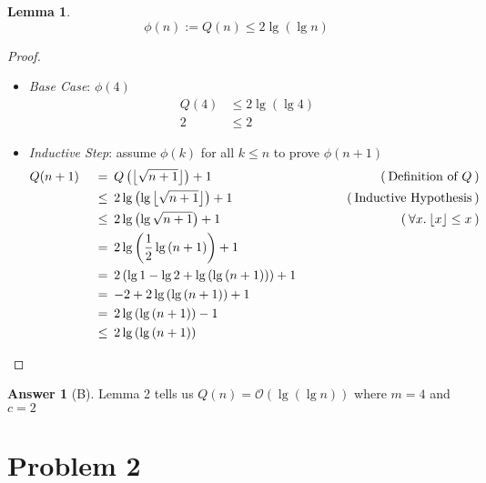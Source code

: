 \documentclass{article}
\newtheorem{lemma}{Lemma}
\theoremstyle{definition}
\newtheorem*{answer}{Answer}
\DeclarePairedDelimiter\floor{\lfloor}{\rfloor}
\newcommand{\evidence}[1]{\ensuremath{\hspace{3em} (\hspace{0.2em} \text{#1} \hspace{0.2em})}}
\newcommand{\asymptotic}[3]{\ensuremath{#2 = #1(#3)}}
\newcommand{\bigO}[2]{\asymptotic{\mathcal{O}}{#1}{#2}}
\newcommand{\relation}[1]{\ensuremath{\hspace{0.2em} {{} #1 {}} \hspace{0.2em}}}
\newcommand{\equal}{\relation{=}}
\newcommand{\lesseq}{\relation{\le}}
\newcommand{\parens}[1]{\left(#1\right)}
\newcommand{\lglg}[1]{\ensuremath{\lg{\parens{\lg{#1}}}}}
\begin{document}
\begin{lemma}
  \begin{equation*}
    \phi(n) := Q(n) \le 2\lglg{n}
  \end{equation*}
\end{lemma}
\begin{proof}
  \hfill
  \begin{itemize}
  \item
    \textit{Base Case}: $\phi(4)$
    \begin{align*}
      Q(4) &\le 2\lglg{4} \\
      2 &\le 2
    \end{align*}
  \item
    \textit{Inductive Step}: assume $\phi(k)$ for all $k \le n$ to prove $\phi(n + 1)$
    \begin{alignat*}{4}
      & Q(n + 1) & \equal & Q\left(\floor*{\sqrt{n + 1}}\right) + 1 & \evidence{Definition of $Q$} \\
      & {}       & \lesseq & 2\lglg{\floor*{\sqrt{n + 1}}} + 1       & \evidence{Inductive Hypothesis} \\
      & {}       & \lesseq & 2\lglg{\sqrt{n + 1}} + 1                & \evidence{$\forall x. \hspace{0.2em} \floor*{x} \le x$} \\
      & {}       & \equal  & 2\lg{\parens{\frac{1}{2}\lg{\parens{n + 1}}}} + 1     & {} \\
      & {}       & \equal  & 2\parens{\lg{1} - \lg{2} + \lglg{\parens{n + 1}}} + 1 & {} \\
      & {}       & \equal  & {-2} + 2\lglg{\parens{n + 1}} + 1                     & {} \\
      & {}       & \equal  & 2\lglg{\parens{n + 1}} - 1                            & {} \\
      & {}       & \lesseq & 2\lglg{\parens{n + 1}}                                & \qedhere
    \end{alignat*}
  \end{itemize}
\end{proof}
\begin{answer}[B]
  Lemma 2 tells us $\bigO{Q(n)}{\lglg{n}}$ where $m = 4$ and $c = 2$
\end{answer}



\section*{Problem 2}
\end{document}
